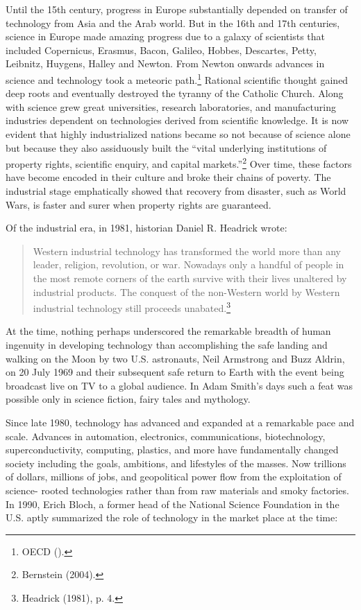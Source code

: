 \begin{multicols}{2}
Until the 15th century, progress in Europe substantially depended on transfer of technology from Asia and the Arab world. But in the 16th and 17th centuries, science in Europe made amazing progress due to a galaxy of scientists that included Copernicus, Erasmus, Bacon, Galileo, Hobbes, Descartes, Petty, Leibnitz, Huygens, Halley and Newton. From Newton onwards advances in science and technology took a meteoric path.\footnote{OECD ().} Rational scientific thought gained deep roots and eventually destroyed the tyranny of the Catholic Church. Along with science grew great universities, research laboratories, and manufacturing industries dependent on technologies derived from scientific knowledge. It is now evident that highly industrialized nations became so not because of science alone but because they also assiduously built the “vital underlying institutions of property rights, scientific enquiry, and capital markets.”\footnote{Bernstein (2004).} Over time, these factors have become encoded in their culture and broke their chains of poverty. The industrial stage emphatically showed that recovery from disaster, such as World Wars, is faster and surer when property rights are guaranteed.

Of the industrial era, in 1981, historian Daniel R. Headrick wrote:

\begin{quote}
Western industrial technology has transformed the world more than any leader, religion, revolution, or war. Nowadays only a handful of people in the most remote corners of the earth survive with their lives unaltered by industrial products. The conquest of the non-Western world by Western industrial technology still proceeds unabated.\footnote{Headrick (1981), p. 4.}
\end{quote}

At the time, nothing perhaps underscored the remarkable breadth of human ingenuity in developing technology than accomplishing the safe landing and walking on the Moon by two U.S. astronauts, Neil Armstrong and Buzz Aldrin, on 20 July 1969 and their subsequent safe return to Earth with the event being broadcast live on TV to a global audience. In Adam Smith's days such a feat was possible only in science fiction, fairy tales and mythology.

Since late 1980, technology has advanced and expanded at a remarkable pace and scale. Advances in automation, electronics, communications, biotechnology, superconductivity, computing, plastics, and more have fundamentally changed society including the goals, ambitions, and lifestyles of the masses. Now trillions of dollars, millions of jobs, and geopolitical power flow from the exploitation of science- rooted technologies rather than from raw materials and smoky factories. In 1990, Erich Bloch, a former head of the National Science Foundation in the U.S. aptly summarized the role of technology in the market place at the time:


\end{multicols}
